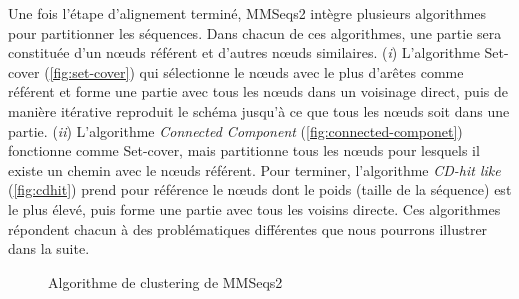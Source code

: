 Une fois l'étape d'alignement terminé, MMSeqs2 intègre plusieurs algorithmes pour partitionner les séquences. Dans chacun de ces algorithmes, une partie sera constituée d'un n\oe uds référent et d'autres n\oe uds similaires. (\textit{i}) L'algorithme Set-cover (\autoref{fig:set-cover}) qui sélectionne le n\oe uds avec le plus d'arêtes comme référent et forme une partie avec tous les n\oe uds dans un voisinage direct, puis de manière itérative reproduit le schéma jusqu'à ce que tous les n\oe uds soit dans une partie. (\textit{ii}) L'algorithme \textit{Connected Component} (\autoref{fig:connected-componet}) fonctionne comme Set-cover, mais partitionne tous les n\oe uds pour lesquels il existe un chemin avec le n\oe uds référent. Pour terminer, l'algorithme \textit{CD-hit like} (\autoref{fig:cdhit}) prend pour référence le n\oe uds dont le poids (taille de la séquence) est le plus élevé, puis forme une partie avec tous les voisins directe. Ces algorithmes répondent chacun à des problématiques différentes que nous pourrons illustrer dans la suite.  

\begin{figure}[htbp]
    \centering
    \hfill
    \hfill
    \caption[Algorithmes de clustering de MMSeqs2]{Algorithme de clustering de MMSeqs2}
    \label{fig:mmclust}
\end{figure}

